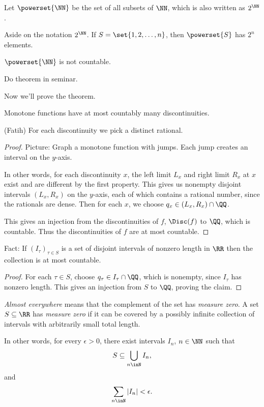\documentclass{article}
\begin{document}
Let $\powerset{\NN}$ be the set of all subsets of $\NN$,
which is also written as $2^\NN$.

Aside on the notation $2^\NN$. If $S=\set{1,2,\ldots,n}$, then $\powerset{S}$ has $2^n$
elements.

\begin{theorem}[Cantor]
$\powerset{\NN}$ is not countable.
\end{theorem}

Do theorem in seminar.

Now we'll prove the theorem.

\begin{theorem}
    Monotone functions have at most countably many discontinuities.
\end{theorem}

(Fatih) For each discontinuity we pick a distinct rational.

\begin{proof}
Picture: Graph a monotone function with jumps. Each jump creates
an interval on the $y$-axis.

In other words, for each discontinuity $x$, the left limit $L_x$
and right limit $R_x$ at $x$ exist and are different by the first
property. This gives us nonempty disjoint intervals $(L_x,R_x)$
on the $y$-axis,
each of which contains a rational number, since the rationals are
dense. Then for each $x$, we choose $q_x\in (L_x,R_x)\cap \QQ$.

This gives an injection from the discontinuities of $f$,
$\Disc(f)$ to $\QQ$, which is countable. Thus the discontinuities
of $f$ are at most countable.
\end{proof}

Fact: If $(I_\tau)_{\tau\in S}$ is a set of disjoint intervals
of nonzero length in $\RR$ then the collection is at most countable.

\begin{proof}
    For each $\tau\in S$, choose $q_\tau \in I_\tau \cap \QQ$,
    which is nonempty, since $I_\tau$ has nonzero length.
    This gives an injection from $S$ to $\QQ$, proving the 
    claim.
\end{proof}

\begin{definition}
    \emph{Almost everywhere} means that the complement of the 
    set has \emph{measure zero}. A set $S\subseteq \RR$ has 
    \emph{measure zero} if it can be covered by a possibly 
    infinite collection of intervals with arbitrarily small 
    total length.

    In other words, for every $\epsilon > 0$, there exist
    intervals $I_n$, $n\in\NN$ such that 
    \[ S\subseteq \bigcup_{n\inN} I_n,\]
    and 
    \[ \sum_{n\inN} |I_n| < \epsilon. \]
\end{definition}
\end{document}
